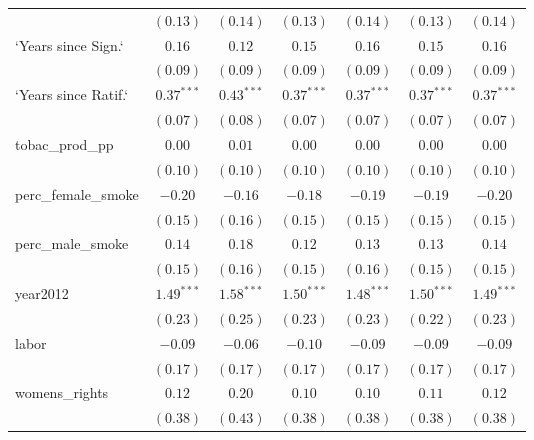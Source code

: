 \begin{table}[!h]
\begin{center}
\begin{tabular}{l c c c c c c }
                        & $(0.13)$     & $(0.14)$     & $(0.13)$     & $(0.14)$     & $(0.13)$     & $(0.14)$     \\
`Years since Sign.`     & $0.16$       & $0.12$       & $0.15$       & $0.16$       & $0.15$       & $0.16$       \\
                        & $(0.09)$     & $(0.09)$     & $(0.09)$     & $(0.09)$     & $(0.09)$     & $(0.09)$     \\
`Years since Ratif.`    & $0.37^{***}$ & $0.43^{***}$ & $0.37^{***}$ & $0.37^{***}$ & $0.37^{***}$ & $0.37^{***}$ \\
                        & $(0.07)$     & $(0.08)$     & $(0.07)$     & $(0.07)$     & $(0.07)$     & $(0.07)$     \\
tobac\_prod\_pp         & $0.00$       & $0.01$       & $0.00$       & $0.00$       & $0.00$       & $0.00$       \\
                        & $(0.10)$     & $(0.10)$     & $(0.10)$     & $(0.10)$     & $(0.10)$     & $(0.10)$     \\
perc\_female\_smoke     & $-0.20$      & $-0.16$      & $-0.18$      & $-0.19$      & $-0.19$      & $-0.20$      \\
                        & $(0.15)$     & $(0.16)$     & $(0.15)$     & $(0.15)$     & $(0.15)$     & $(0.15)$     \\
perc\_male\_smoke       & $0.14$       & $0.18$       & $0.12$       & $0.13$       & $0.13$       & $0.14$       \\
                        & $(0.15)$     & $(0.16)$     & $(0.15)$     & $(0.16)$     & $(0.15)$     & $(0.15)$     \\
year2012                & $1.49^{***}$ & $1.58^{***}$ & $1.50^{***}$ & $1.48^{***}$ & $1.50^{***}$ & $1.49^{***}$ \\
                        & $(0.23)$     & $(0.25)$     & $(0.23)$     & $(0.23)$     & $(0.22)$     & $(0.23)$     \\
labor                   & $-0.09$      & $-0.06$      & $-0.10$      & $-0.09$      & $-0.09$      & $-0.09$      \\
                        & $(0.17)$     & $(0.17)$     & $(0.17)$     & $(0.17)$     & $(0.17)$     & $(0.17)$     \\
womens\_rights          & $0.12$       & $0.20$       & $0.10$       & $0.10$       & $0.11$       & $0.12$       \\
                        & $(0.38)$     & $(0.43)$     & $(0.38)$     & $(0.38)$     & $(0.38)$     & $(0.38)$     \\

\end{tabular}
\end{center}
\end{table}
